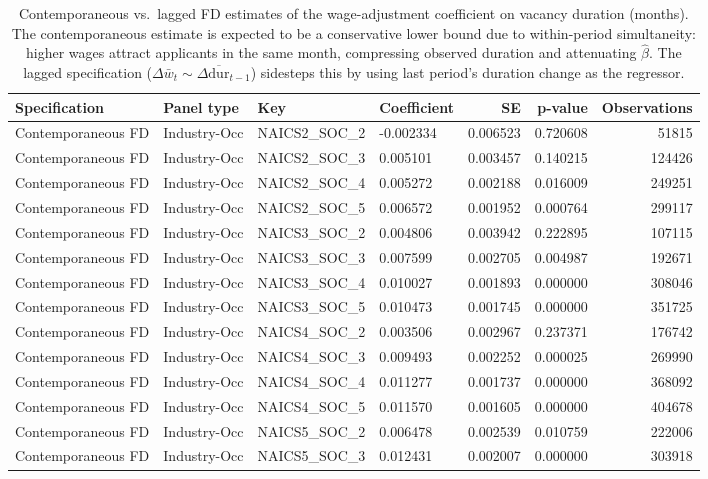 \begin{table}
\caption{Contemporaneous vs.\ lagged FD estimates of the wage-adjustment coefficient on vacancy duration (months). The contemporaneous estimate is expected to be a conservative lower bound due to within-period simultaneity: higher wages attract applicants in the same month, compressing observed duration and attenuating $\hat{\beta}$. The lagged specification ($\Delta \bar{w}_t \sim \Delta \overline{\text{dur}}_{t-1}$) sidesteps this by using last period's duration change as the regressor.}
\label{tab:robustness_comparison}
\begin{tabular}{llllrrr}
\toprule
Specification & Panel type & Key & Coefficient & SE & p-value & Observations \\
\midrule
Contemporaneous FD & Industry-Occ & NAICS2_SOC_2 & -0.002334 & 0.006523 & 0.720608 & 51815 \\
Contemporaneous FD & Industry-Occ & NAICS2_SOC_3 & 0.005101 & 0.003457 & 0.140215 & 124426 \\
Contemporaneous FD & Industry-Occ & NAICS2_SOC_4 & 0.005272 & 0.002188 & 0.016009 & 249251 \\
Contemporaneous FD & Industry-Occ & NAICS2_SOC_5 & 0.006572 & 0.001952 & 0.000764 & 299117 \\
Contemporaneous FD & Industry-Occ & NAICS3_SOC_2 & 0.004806 & 0.003942 & 0.222895 & 107115 \\
Contemporaneous FD & Industry-Occ & NAICS3_SOC_3 & 0.007599 & 0.002705 & 0.004987 & 192671 \\
Contemporaneous FD & Industry-Occ & NAICS3_SOC_4 & 0.010027 & 0.001893 & 0.000000 & 308046 \\
Contemporaneous FD & Industry-Occ & NAICS3_SOC_5 & 0.010473 & 0.001745 & 0.000000 & 351725 \\
Contemporaneous FD & Industry-Occ & NAICS4_SOC_2 & 0.003506 & 0.002967 & 0.237371 & 176742 \\
Contemporaneous FD & Industry-Occ & NAICS4_SOC_3 & 0.009493 & 0.002252 & 0.000025 & 269990 \\
Contemporaneous FD & Industry-Occ & NAICS4_SOC_4 & 0.011277 & 0.001737 & 0.000000 & 368092 \\
Contemporaneous FD & Industry-Occ & NAICS4_SOC_5 & 0.011570 & 0.001605 & 0.000000 & 404678 \\
Contemporaneous FD & Industry-Occ & NAICS5_SOC_2 & 0.006478 & 0.002539 & 0.010759 & 222006 \\
Contemporaneous FD & Industry-Occ & NAICS5_SOC_3 & 0.012431 & 0.002007 & 0.000000 & 303918 \\

\end{tabular}
\end{table}
